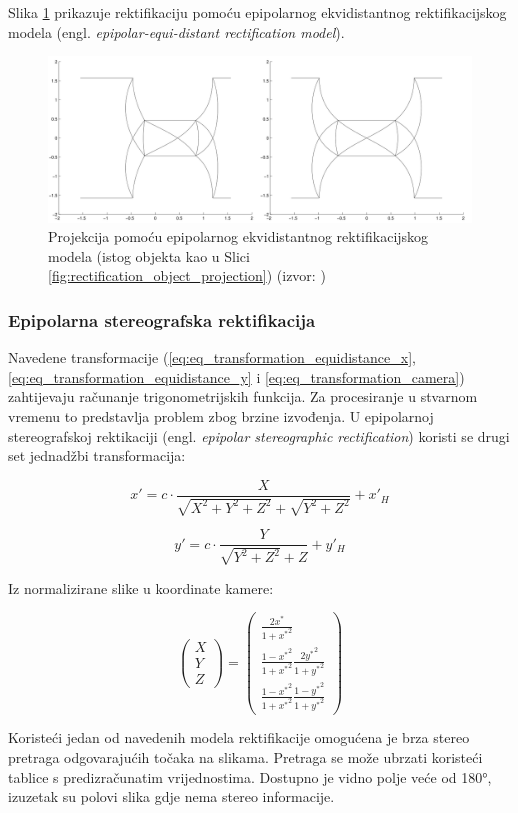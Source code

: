 \documentclass[../seminar.tex]{subfiles}
\begin{document}
Slika \ref{fig:rectification_object_projection_epipolar_equidistant} prikazuje rektifikaciju pomoću epipolarnog ekvidistantnog rektifikacijskog modela (engl. \textit{epipolar-equi-distant rectification model}).

\begin{figure}[ht!]
  \centering
    \includegraphics[width=.99\textwidth]{img_011_epipolar_equidistant.png}
   \caption{Projekcija pomoću epipolarnog ekvidistantnog rektifikacijskog modela (istog objekta kao u Slici \ref{fig:rectification_object_projection}) (izvor: \cite{Abraham})}
  \label{fig:rectification_object_projection_epipolar_equidistant}
\end{figure}

\subsubsection{Epipolarna stereografska rektifikacija}

Navedene transformacije (\ref{eq:eq_transformation_equidistance_x}, \ref{eq:eq_transformation_equidistance_y} i \ref{eq:eq_transformation_camera}) zahtijevaju računanje trigonometrijskih funkcija. Za procesiranje u stvarnom vremenu to predstavlja problem zbog brzine izvođenja. U epipolarnoj stereografskoj rektikaciji (engl. \textit{epipolar stereographic rectification}) koristi se drugi set jednadžbi transformacija:


\begin{equation}
\label{eq:epipolar_stereographic_x}
x' = c·\frac{X}{\sqrt{X^2+Y^2+Z^2} + \sqrt{Y^2+Z^2}} + x'_H
\end{equation}

\begin{equation}
\label{eq:epipolar_stereographic_y}
y' = c·\frac{Y}{\sqrt{Y^2+Z^2} + Z} + y'_H
\end{equation}

Iz normalizirane slike u koordinate kamere:

\begin{equation}
\label{eq:eq_transformation_camera}
\begin{pmatrix} X \\ Y \\ Z \end{pmatrix} = \begin{pmatrix} \frac{2x^*}{1+{x^*}^2} \\ \frac{1-{x^*}^2}{1+{x^*}^2}\frac{2{y^*}^2}{1+{y^*}^2} \\ \frac{1-{x^*}^2}{1+{x^*}^2}\frac{1-{y^*}^2}{1+{y^*}^2} \end{pmatrix}
\end{equation}




Koristeći jedan od navedenih modela rektifikacije omogućena je brza stereo pretraga odgovarajućih točaka na slikama.
Pretraga se može ubrzati koristeći tablice s predizračunatim vrijednostima. Dostupno je vidno polje veće od 180°, izuzetak su polovi slika gdje nema stereo informacije.
\end{document}
